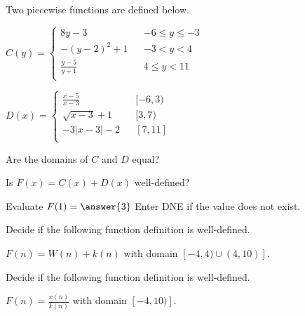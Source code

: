 \documentclass{ximera}
\begin{document}
\begin{definition}
Two piecewise functions are defined below.

$C(y) =   
\left \{ \begin{aligned}     
8 y - 3 && -6 \leq y \leq -3 \\        
-(y-2)^2 + 1 && -3 < y < 4 \\      
\frac{y-5}{y+1} && 4 \leq y < 11\\       
\end{aligned} \right .$ 




$D(x) =   
\left \{ \begin{aligned}     
\frac{x-5}{x-3} && [-6, 3) \\        
\sqrt{x-3} + 1 && [3, 7) \\      
-3|x-3|-2 && [7, 11]\\       
\end{aligned} \right .$ 


\end{definition}





\begin{exercise}
Are the domains of $C$ and $D$ equal?

\begin{multipleChoice}
\end{multipleChoice}

\end{exercise}


\begin{exercise}
Is $F(x) = C(x) + D(x)$ well-defined?

\begin{multipleChoice}
\end{multipleChoice}

\end{exercise}





\begin{exercise}
Evaluate $F(1) = \answer{3}$
Enter DNE if the value does not exist.

\end{exercise}




\begin{exercise}
Decide if the following function definition is well-defined.

$F(n) = W(n) + k(n)$ with domain $[-4, 4) \cup (4, 10)]$.

\begin{multipleChoice}
\end{multipleChoice}

\end{exercise}





\begin{exercise}
Decide if the following function definition is well-defined.

$F(n) = \frac{x(n)}{k(n)}$ with domain $[-4, 10)]$.

\begin{multipleChoice}
\end{multipleChoice}

\end{exercise}
\end{document}
